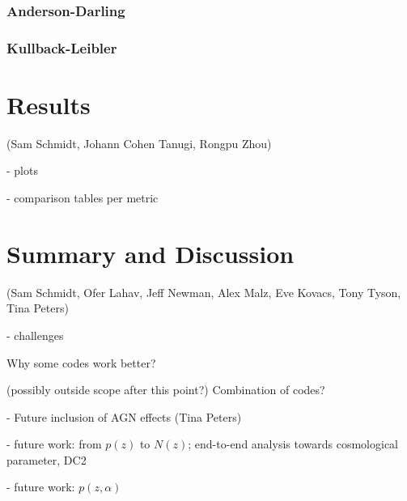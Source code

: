 \documentclass[usenatbib]{mn2e}
\begin{document}
\subsubsection{Anderson-Darling}

\subsubsection{Kullback-Leibler}

\section{Results}\label{results}

(Sam Schmidt, Johann Cohen Tanugi, Rongpu Zhou)

- plots

- comparison tables per metric

\section{Summary and Discussion}\label{discussion}

(Sam Schmidt, Ofer Lahav, Jeff Newman, Alex Malz, Eve Kovacs, Tony Tyson, Tina Peters)

- challenges

Why some codes work better?

(possibly outside scope after this point?)
Combination of codes? 

-  Future inclusion of AGN effects (Tina Peters)

- future work: from $p(z)$ to $N(z)$; end-to-end analysis towards cosmological parameter, DC2

- future work: $p(z,\alpha)$


\end{document}
